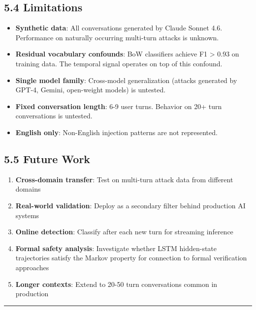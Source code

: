 \documentclass[
  11pt,
]{report}
\providecommand{\tightlist}{%
  \setlength{\itemsep}{0pt}\setlength{\parskip}{0pt}}
\begin{document}
\subsection{5.4 Limitations}\label{limitations}

\begin{itemize}
\tightlist
\item
  \textbf{Synthetic data}: All conversations generated by Claude Sonnet
  4.6. Performance on naturally occurring multi-turn attacks is unknown.
\item
  \textbf{Residual vocabulary confounds}: BoW classifiers achieve F1
  \textgreater{} 0.93 on training data. The temporal signal operates on
  top of this confound.
\item
  \textbf{Single model family}: Cross-model generalization (attacks
  generated by GPT-4, Gemini, open-weight models) is untested.
\item
  \textbf{Fixed conversation length}: 6-9 user turns. Behavior on 20+
  turn conversations is untested.
\item
  \textbf{English only}: Non-English injection patterns are not
  represented.
\end{itemize}

\subsection{5.5 Future Work}\label{future-work}

\begin{enumerate}
\def\labelenumi{\arabic{enumi}.}
\tightlist
\item
  \textbf{Cross-domain transfer}: Test on multi-turn attack data from
  different domains
\item
  \textbf{Real-world validation}: Deploy as a secondary filter behind
  production AI systems
\item
  \textbf{Online detection}: Classify after each new turn for streaming
  inference
\item
  \textbf{Formal safety analysis}: Investigate whether LSTM hidden-state
  trajectories satisfy the Markov property for connection to formal
  verification approaches
\item
  \textbf{Longer contexts}: Extend to 20-50 turn conversations common in
  production
\end{enumerate}

\begin{center}\rule{0.5\linewidth}{0.5pt}\end{center}
\end{document}
